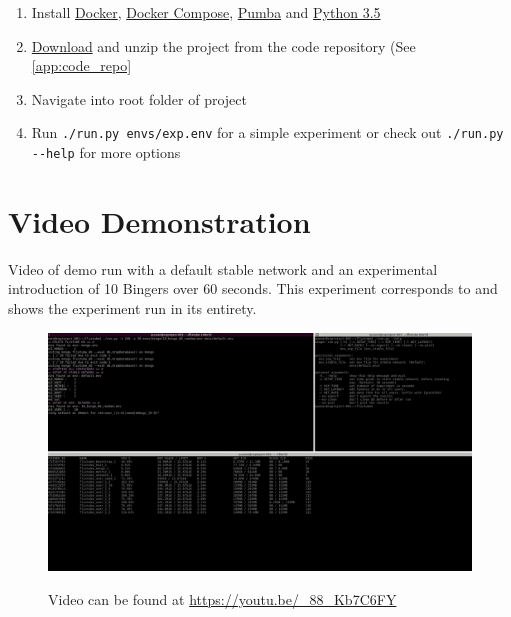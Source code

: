 \begin{enumerate}
    \item Install \href{https://docs.docker.com/install/}{Docker}, \href{https://docs.docker.com/compose/install/}{Docker Compose}, \href{https://github.com/alexei-led/pumba/releases}{Pumba} and \href{https://www.python.org/downloads/}{Python 3.5}
    \item \href{https://github.com/andreasmalling/flixtube/archive/master.zip}{Download} and unzip the project from the code repository (See \autoref{app:code_repo}
    \item Navigate into root folder of project
    \item Run \lstinline[columns=fixed]{./run.py envs/exp.env} for a simple experiment or check out \lstinline[columns=fixed]{./run.py --help} for more options
\end{enumerate}
\newpage
\section{Video Demonstration}
Video of demo run with a default stable network and an experimental introduction of 10 Bingers over 60 seconds. This experiment corresponds to  and shows the experiment run in its entirety.

\begin{figure}[htbp]
    \myfloatalign
    \href{https://www.youtube.com/v/_88_Kb7C6FY?rel=0}{\includegraphics[width=\linewidth]{gfx/demo.jpg}}
    \caption*{Video can be found at \url{https://youtu.be/_88_Kb7C6FY}}
    \label{vid:demo_b10}
\end{figure}
